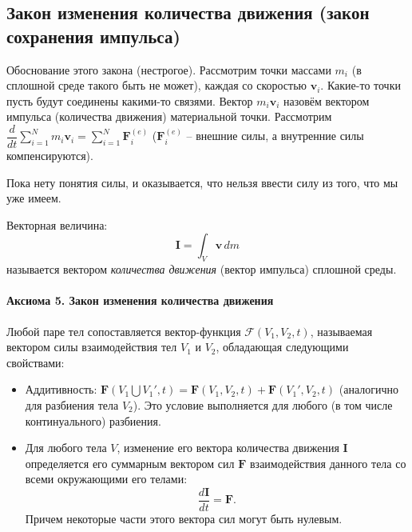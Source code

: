 \subsection{Закон изменения количества движения (закон сохранения импульса)}

Обоснование этого закона (нестрогое). Рассмотрим точки массами $m_i$ (в сплошной среде такого
быть не может), каждая со скоростью $\mathbf{v}_i$. Какие-то точки пусть будут соединены
какими-то связями. Вектор $m_i \mathbf{v}_i$ назовём вектором импульса (количества движения)
материальной точки. Рассмотрим $\dfrac{d}{dt} \sum_{i=1}^N m_i \mathbf{v}_i = \sum_{i=1}^N \mathbf{F}_i^{(e)}$ ($\mathbf{F}_i^{(e)}$ -- внешние силы, а внутренние силы компенсируются).


Пока нету понятия силы, и оказывается, что нельзя ввести силу из того, что мы уже имеем.

\begin{definition}
  Векторная величина:
  \[
    \mathbf{I} = \int_V \mathbf{v} \, dm
  \]
  называется вектором \emph{количества движения} (вектор импульса) сплошной среды.
\end{definition}


\paragraph{Аксиома 5. Закон изменения количества движения}

Любой паре тел сопоставляется вектор-функция $\mathcal{F}(V_1, V_2, t)$, называемая
вектором силы взаимодействия тел $V_1$ и $V_2$, обладающая следующими свойствами:
\begin{itemize}
  \item Аддитивность: $\mathcal{\mathbf{F}}(V_1 \bigcup V_1', t)
    = \mathcal{\mathbf{F}}(V_1, V_2, t) + \mathcal{\mathbf{F}}(V_1', V_2, t)$
    (аналогично для разбиения тела $V_2$). Это условие выполняется для любого
    (в том числе континуального) разбиения.
  \item Для любого тела $V$, изменение его вектора количества движения $\mathbf{I}$
    определяется его суммарным вектором сил $\mathcal{\mathbf{F}}$ взаимодействия
    данного тела со всеми окружающими его телами:
    \[
      \dfrac{d\mathbf{I}}{dt} = \mathcal{\mathbf{F}}.
    \]
    Причем некоторые части этого вектора сил могут быть нулевым.
\end{itemize}
